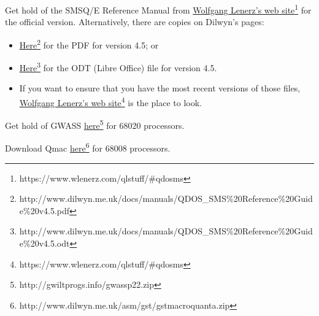 Get hold of the SMSQ/E Reference Manual from \href{https://www.wlenerz.com/qlstuff/\#qdosms}{Wolfgang Lenerz's web site}\footnote{https://www.wlenerz.com/qlstuff/\#qdosms}
for the official version. Alternatively, there are copies on Dilwyn's
pages:
\begin{itemize}
\item \href{http://www.dilwyn.me.uk/docs/manuals/QDOS_SMS\%20Reference\%20Guide\%20v4.5.pdf}{Here}\footnote{http://www.dilwyn.me.uk/docs/manuals/QDOS\_SMS\%20Reference\%20Guide\%20v4.5.pdf}
for the PDF for version 4.5; or
\item \href{http://www.dilwyn.me.uk/docs/manuals/QDOS_SMS\%20Reference\%20Guide\%20v4.5.odt}{Here}\footnote{http://www.dilwyn.me.uk/docs/manuals/QDOS\_SMS\%20Reference\%20Guide\%20v4.5.odt}
for the ODT (Libre Office) file for version 4.5.
\item If you want to ensure that you have the most recent versions of those
files, \href{https://www.wlenerz.com/qlstuff/\#qdosms}{Wolfgang Lenerz's web site}\footnote{https://www.wlenerz.com/qlstuff/\#qdosms}
is the place to look.
\end{itemize}
Get hold of GWASS \href{http://gwiltprogs.info/gwassp22.zip}{here}\footnote{http://gwiltprogs.info/gwassp22.zip}
for 68020 processors.

Download Qmac \href{http://www.dilwyn.me.uk/asm/gst/gstmacroquanta.zip}{here}\footnote{http://www.dilwyn.me.uk/asm/gst/gstmacroquanta.zip}
for 68008 processors.
